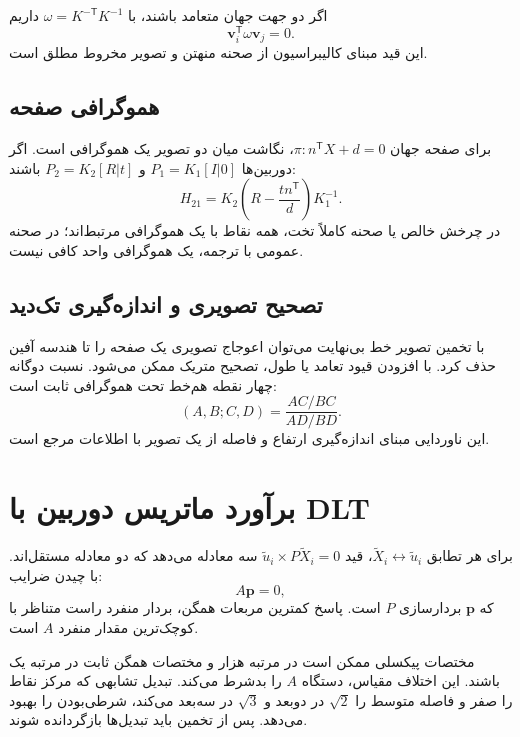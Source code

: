 \documentclass[12pt,openany,oneside]{book}
\newcommand{\trans}{^{\mathsf T}}
\newcommand{\vect}[1]{\bm{#1}}
\begin{document}
اگر دو جهت جهان متعامد باشند، با \(\omega=K^{-\mathsf T}K^{-1}\) داریم
\begin{equation}
\vect v_i\trans\omega\vect v_j=0.
\end{equation}
این قید مبنای کالیبراسیون از صحنه منهتن و تصویر مخروط مطلق است.

\subsection{هموگرافی صفحه}
برای صفحه جهان \(\pi:n\trans X+d=0\)، نگاشت میان دو تصویر یک هموگرافی است. اگر دوربین‌ها
\(P_1=K_1[I|0]\) و \(P_2=K_2[R|t]\) باشند:
\begin{equation}
H_{21}=K_2\left(R-\frac{tn\trans}{d}\right)K_1^{-1}.
\label{eq:plane-homography}
\end{equation}
در چرخش خالص یا صحنه کاملاً تخت، همه نقاط با یک هموگرافی مرتبط‌اند؛ در صحنه عمومی با ترجمه، یک هموگرافی واحد کافی نیست.

\subsection{تصحیح تصویری و اندازه‌گیری تک‌دید}
با تخمین تصویر خط بی‌نهایت می‌توان اعوجاج تصویری یک صفحه را تا هندسه آفین حذف کرد. با افزودن قیود تعامد یا طول،
تصحیح متریک ممکن می‌شود. نسبت دوگانه چهار نقطه هم‌خط تحت هموگرافی ثابت است:
\begin{equation}
(A,B;C,D)=\frac{AC/BC}{AD/BD}.
\end{equation}
این ناوردایی مبنای اندازه‌گیری ارتفاع و فاصله از یک تصویر با اطلاعات مرجع است.

\section{برآورد ماتریس دوربین با DLT}

برای هر تطابق \(\widetilde X_i\leftrightarrow\widetilde u_i\)، قید
\(\widetilde u_i\times P\widetilde X_i=0\) سه معادله می‌دهد که دو معادله مستقل‌اند. با چیدن ضرایب:
\begin{equation}
A\vect p=0,
\end{equation}
که \(\vect p\) بردارسازی \(P\) است. پاسخ کمترین مربعات همگن، بردار منفرد راست متناظر با کوچک‌ترین مقدار منفرد \(A\) است.

\begin{proofbox}
مختصات پیکسلی ممکن است در مرتبه هزار و مختصات همگن ثابت در مرتبه یک باشند. این اختلاف مقیاس، دستگاه \(A\) را بدشرط
می‌کند. تبدیل تشابهی که مرکز نقاط را صفر و فاصله متوسط را \(\sqrt{2}\) در دوبعد و \(\sqrt{3}\) در سه‌بعد می‌کند،
شرطی‌بودن را بهبود می‌دهد. پس از تخمین باید تبدیل‌ها بازگردانده شوند.
\end{proofbox}
\end{document}
